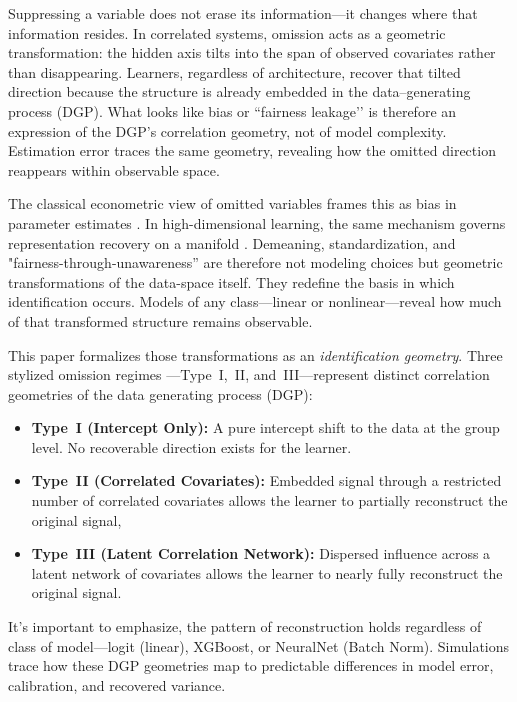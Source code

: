 \documentclass[11pt]{article}
\begin{document}
Suppressing a variable does not erase its information—it changes where that information resides.
In correlated systems, omission acts as a geometric transformation: the hidden axis tilts into the span of observed covariates rather than disappearing.
Learners, regardless of architecture, recover that tilted direction because the structure is already embedded in the data–generating process (DGP).
What looks like bias or “fairness leakage’’ is therefore an expression of the DGP’s correlation geometry, not of model complexity.
Estimation error traces the same geometry, revealing how the omitted direction reappears within observable space.

The classical econometric view of omitted variables frames this as bias in parameter estimates \cite{angrist2009mostly,wooldridge2010econometric}.
In high-dimensional learning, the same mechanism governs representation recovery on a manifold \cite{bengio2013representation,bietti2021learning}.
Demeaning, standardization, and "fairness-through-unawareness'' \cite{barocas2016big,dwork2012fairness} are therefore not modeling choices but geometric transformations of the data-space itself.
They redefine the basis in which identification occurs.
Models of any class—linear or nonlinear—reveal how much of that transformed structure remains observable.

This paper formalizes those transformations as an \emph{identification geometry}.
Three stylized omission regimes
—Type~I,~II, and~III—represent distinct correlation geometries of the data generating process (DGP):
\begin{itemize}
   \item \textbf{Type~I (Intercept Only):}
        A pure intercept shift to the data at the group level. No recoverable direction exists for the learner.
   \item \textbf{Type~II (Correlated Covariates):}
        Embedded signal through a restricted number of correlated covariates allows the learner to partially reconstruct the original signal,
   \item \textbf{Type~III (Latent Correlation Network):}
         Dispersed influence across a latent network of covariates allows the learner to nearly fully reconstruct the original signal.
\end{itemize}
It's important to emphasize, the pattern of reconstruction holds regardless of class of model—logit (linear), XGBoost, or NeuralNet (Batch Norm). Simulations trace how these DGP geometries map to predictable differences in model error, calibration, and recovered variance.
\end{document}
